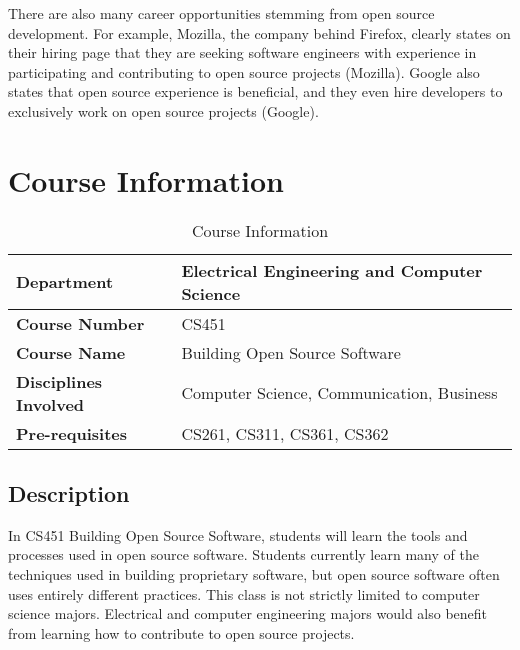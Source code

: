 \documentclass[12pt,letterpaper]{article}
\begin{document}
There are also many career opportunities stemming from open source development.
For example, Mozilla, the company behind Firefox, clearly states on their hiring
page that they are seeking software engineers with experience in participating
and contributing to open source projects (Mozilla).  Google also states that
open source experience is beneficial, and they even hire developers to
exclusively work on open source projects (Google).

\section{Course Information}

\begin{table}[H]
  \begin{center}
    \renewcommand{\arraystretch}{1.5}
    \begin{tabular}{ | l | l | }
      \hline
      \textbf{Department}
        & Electrical Engineering and Computer Science \\ \hline
      \textbf{Course Number}
        & CS451 \\ \hline
      \textbf{Course Name}
        & Building Open Source Software\\ \hline
      \textbf{Disciplines Involved}
        & Computer Science, Communication, Business \\ \hline
      \textbf{Pre-requisites}
        & CS261, CS311, CS361, CS362 \\ \hline
    \end{tabular}
    \caption{Course Information}
  \end{center}
\end{table}

\subsection{Description}
In CS451 Building Open Source Software, students will learn the tools and
processes used in open source software.  Students currently learn many of the
techniques used in building proprietary software, but open source software often
uses entirely different practices.  This class is not strictly limited to
computer science majors.  Electrical and computer engineering majors would also
benefit from learning how to contribute to open source projects.
\end{document}
